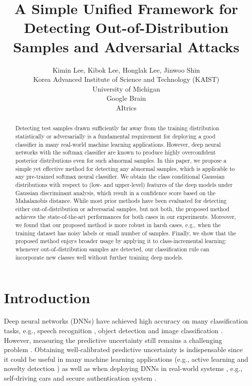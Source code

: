 \documentclass{article}
\title{A Simple Unified Framework for Detecting Out-of-Distribution Samples and Adversarial Attacks}
\author{
Kimin Lee, Kibok Lee, Honglak Lee, Jinwoo Shin\\
Korea Advanced Institute of Science and Technology (KAIST)\\
University of Michigan\\
Google Brain\\
AItrics\\
}
\begin{document}
\maketitle

\begin{abstract}
Detecting test samples drawn sufficiently far away from the training distribution statistically
or adversarially is a fundamental requirement for deploying a good classifier in many real-world machine learning applications. 
However, deep neural networks with the softmax classifier are known to produce highly overconfident posterior distributions even for such abnormal samples.
In this paper, we propose a simple yet effective method for detecting
any abnormal samples, which is applicable to any pre-trained softmax neural classifier. We obtain the class conditional Gaussian distributions with respect to (low- and upper-level) features of the deep models under Gaussian discriminant analysis, which result in a confidence score based on the Mahalanobis distance.
While most prior methods have been evaluated for detecting either out-of-distribution or adversarial samples, but not both,
the proposed method achieves the state-of-the-art performances for both cases 
in our experiments.
Moreover, we found that our proposed method is more robust in harsh cases, e.g., when the training dataset has noisy labels or small number of samples.
Finally, we show that the proposed method enjoys broader usage by applying it to class-incremental learning:
whenever out-of-distribution samples are detected, our classification rule can incorporate new classes well without further training deep models.
\end{abstract}

\section{Introduction} \label{sec:intro}


Deep neural networks (DNNs) have achieved high accuracy on many classification tasks, 
e.g., speech recognition \citep{amodei2016deep}, object detection \citep{girshick2015fast} and image classification \citep{he2016deep}.
However, measuring the predictive uncertainty still remains a challenging problem \citep{lee2017training,liang2017principled}.
Obtaining well-calibrated predictive uncertainty is indispensable since it could be useful in many machine learning applications (e.g., active learning \citep{gal2017deep} and novelty detection \citep{lee2018hierarchical}) as well as when deploying DNNs in real-world systems \citep{amodei2016concrete}, e.g., self-driving cars and secure authentication system \citep{evtimov2017robust,sharif2016accessorize}.
\end{document}
